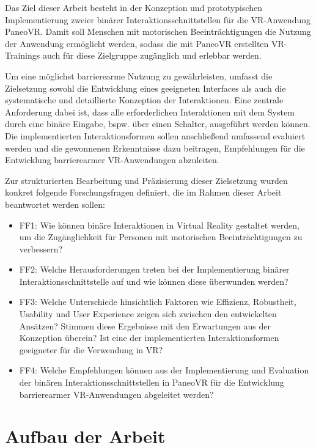 Das Ziel dieser Arbeit besteht in der Konzeption und prototypischen Implementierung zweier binärer Interaktionsschnittstellen für die VR-Anwendung PaneoVR. Damit soll Menschen mit motorischen Beeinträchtigungen die Nutzung der Anwendung ermöglicht werden, sodass die mit PaneoVR erstellten VR-Trainings auch für diese Zielgruppe zugänglich und erlebbar werden.

Um eine möglichst barrierearme Nutzung zu gewährleisten, umfasst die Zielsetzung sowohl die Entwicklung eines geeigneten Interfaces als auch die systematische und detaillierte Konzeption der Interaktionen. Eine zentrale Anforderung dabei ist, dass alle erforderlichen Interaktionen mit dem System durch eine binäre Eingabe, bspw. über einen Schalter, ausgeführt werden können. Die implementierten Interaktionsformen sollen anschließend umfassend evaluiert werden und die gewonnenen Erkenntnisse dazu beitragen, Empfehlungen für die Entwicklung barrierearmer VR-Anwendungen abzuleiten.

Zur strukturierten Bearbeitung und Präzisierung dieser Zielsetzung wurden konkret folgende Forschungsfragen definiert, die im Rahmen dieser Arbeit beantwortet werden sollen:

\begin{itemize}
    \item FF1: Wie können binäre Interaktionen in Virtual Reality gestaltet werden, um die Zugänglichkeit für Personen mit motorischen Beeinträchtigungen zu verbessern?
    \item FF2: Welche Herausforderungen treten bei der Implementierung binärer Interaktionsschnittstelle auf und wie können diese überwunden werden?  
    \item FF3: Welche Unterschiede hinsichtlich Faktoren wie Effizienz, Robustheit, Usability und User Experience zeigen sich zwischen den entwickelten Ansätzen? Stimmen diese Ergebnisse mit den Erwartungen aus der Konzeption überein? Ist eine der implementierten Interaktionsformen geeigneter für die Verwendung in VR?
    \item FF4: Welche Empfehlungen können aus der Implementierung und Evaluation der binären Interaktionsschnittstellen in PaneoVR für die Entwicklung barrierearmer VR-Anwendungen abgeleitet werden?
\end{itemize}
 

\section{Aufbau der Arbeit}

